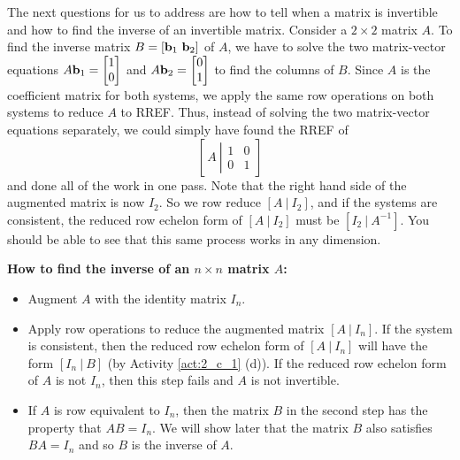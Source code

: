 
The next questions for us to address are how to tell when a matrix is invertible and how to find the inverse of an invertible matrix. Consider a $2 \times 2$ matrix $A$. To find the inverse matrix $B = [\vb_1 \ \vb_2]$ of $A$, we have to solve the two matrix-vector equations $A \mathbf{b}_1 = \begin{bmatrix}1 \\ 0 \end{bmatrix}$ and $A \mathbf{b}_2= \begin{bmatrix}0 \\1 \end{bmatrix}$ to find the columns of $B$. Since $A$ is the coefficient matrix for both systems, we apply the same row operations on both systems to reduce $A$ to RREF. Thus, instead of solving the two matrix-vector equations separately, we could simply have found the RREF of 
\[\left[\, A \ \left| \begin{array}{cc} 1 & 0 \\ 0 & 1 \end{array}\right. \right]\]
and done all of the work in one pass. Note that the right hand side of the augmented matrix is now $I_2$. So we row reduce $[A \ | \ I_2]$, and if the systems are consistent, the reduced row echelon form of $[A \ | \ I_2]$ must be $[I_2 \ | \ A^{-1}]$.  You should be able to see that this same process works in any dimension. 



\noindent \textbf{How to find the inverse of an $n \times n$ matrix $A$:}
\begin{itemize}
\item Augment $A$ with the identity matrix $I_n$.
\item Apply row operations to reduce the augmented matrix $[A \ | \ I_n]$. If the system is consistent, then the reduced row echelon form of $[A \ | \ I_n]$ will have the form $[I_n \ | \ B]$ (by Activity \ref{act:2_c_1} (d)). If the reduced row echelon form of $A$ is not $I_n$, then this step fails and $A$ is not invertible.
\item If $A$ is row equivalent to $I_n$, then the matrix $B$ in the second step has the property that $AB = I_n$. We will show later that the matrix $B$ also satisfies $BA = I_n$ and so $B$ is the inverse of $A$.
\end{itemize}



